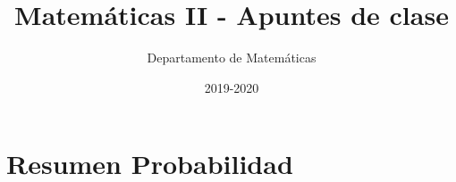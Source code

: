 \documentclass[nobuilddate,nochap]{Docencia}
\title{Matemáticas II - Apuntes de clase}
\author{Departamento de Matemáticas}
\date{2019-2020}
\begin{document}
\pagestyle{plain}
\section{Resumen Probabilidad}

\end{document}

